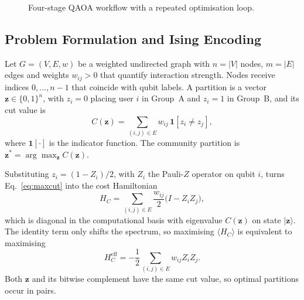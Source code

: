 \documentclass[pdflatex,sn-mathphys-num]{sn-jnl}
\theoremstyle{thmstyleone}
\theoremstyle{thmstyletwo}
\theoremstyle{thmstylethree}
\begin{document}
\begin{figure}[h]
\centering
{}
\caption{Four-stage QAOA workflow with a repeated optimisation loop.}
\label{fig:workflow}
\end{figure}

\subsection{Problem Formulation and Ising Encoding}\label{sec:formulation}

Let $G=(V,E,w)$ be a weighted undirected graph with $n=|V|$ nodes, $m=|E|$ edges and weights $w_{ij}>0$ that quantify interaction strength. Nodes receive indices $0,\ldots,n-1$ that coincide with qubit labels. A partition is a vector $\mathbf{z}\in\{0,1\}^n$, with $z_i=0$ placing user $i$ in Group~A and $z_i=1$ in Group~B, and its cut value is
\begin{equation}
  C(\mathbf{z}) = \sum_{(i,j)\in E} w_{ij}\,\mathbf{1}[z_i\neq z_j],
  \label{eq:maxcut}
\end{equation}
where $\mathbf{1}[\cdot]$ is the indicator function. The community partition is $\mathbf{z}^{*}=\arg\max_{\mathbf{z}} C(\mathbf{z})$.

Substituting $z_i=(1-Z_i)/2$, with $Z_i$ the Pauli-$Z$ operator on qubit $i$, turns Eq.~\eqref{eq:maxcut} into the cost Hamiltonian
\begin{equation}
  H_C = \sum_{(i,j)\in E} \frac{w_{ij}}{2}\bigl(I - Z_iZ_j\bigr),
  \label{eq:hc}
\end{equation}
which is diagonal in the computational basis with eigenvalue $C(\mathbf{z})$ on state $|\mathbf{z}\rangle$. The identity term only shifts the spectrum, so maximising $\langle H_C\rangle$ is equivalent to maximising
\begin{equation}
  H_C^{\mathrm{eff}} = -\frac{1}{2}\sum_{(i,j)\in E} w_{ij}Z_iZ_j.
  \label{eq:hc_eff}
\end{equation}
Both $\mathbf{z}$ and its bitwise complement have the same cut value, so optimal partitions occur in pairs.
\end{document}
